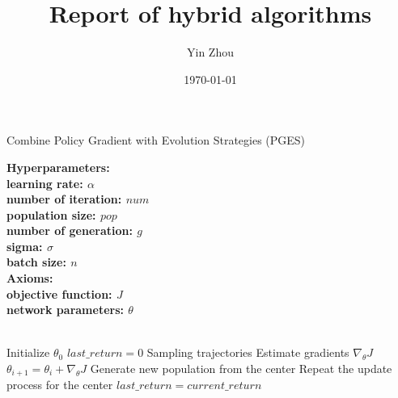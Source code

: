 \documentclass{article}
\title{Report of hybrid algorithms}
\author{Yin Zhou}
\date{\today}
\begin{document}
	
	\maketitle
	
	\newpage
	
	\begin{algorithm}
		\caption{Combine Policy Gradient with Evolution Strategies (PGES)}
		\label{alg1}
		\textbf{Hyperparameters:
			\\ \hspace*{.5cm} learning rate: $\alpha$
			\\ \hspace*{.5cm} number of iteration: $num$
			\\ \hspace*{.5cm} population size: $pop$
			\\ \hspace*{.5cm} number of generation: $g$
			\\ \hspace*{.5cm} sigma: $\sigma$
			\\ \hspace*{.5cm} batch size: $n$
			\\	Axioms:
			\\ \hspace*{.5cm} objective function: $J$
			\\ \hspace*{.5cm} network parameters: $\theta$}
		
		
		\begin{algorithmic}
			\\\hrulefill
			\State Initialize $\theta_{0}$ 
     		\State $last\_return = 0$
			\State Sampling trajectories 
			\State Estimate gradients $\nabla_{\theta} J$ 
			\State $\theta_{i+1} = \theta_{i} + \nabla_{\theta} J$
			\State Generate new population from the center 
			\State Repeat the update process for the center
			\EndFor
			\State $last\_return = current\_return$
			\EndIf
			\EndFor
		\end{algorithmic}
	\end{algorithm}
\end{document}
